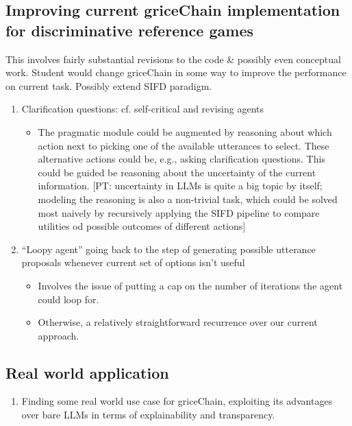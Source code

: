 \documentclass[fleqn,reqno,10pt]{article}
\newcommand{\pt}[1]{\textcolor{CSP-accent-1}{[PT: #1]}}
\begin{document}
\subsection{Improving current griceChain implementation for discriminative reference games}

This involves fairly substantial revisions to the code \& possibly even conceptual work.  Student would change griceChain in some way to improve the performance on current task. Possibly extend SIFD paradigm.

\begin{enumerate}
  \item Clarification questions: cf. self-critical and revising agents
  \begin{itemize}
    \item The pragmatic module could be augmented by reasoning about which action next to picking one of the available utterances to select. These alternative actions could be, e.g., asking clarification questions. This could be guided be reasoning about the uncertainty of the current information. \pt{uncertainty in LLMs is quite a big topic by itself; modeling the reasoning is also a non-trivial task, which could be solved most naively by recursively applying the SIFD pipeline to compare utilities od possible outcomes of different actions}
  \end{itemize}
  \item ``Loopy agent'' going back to the step of generating possible utterance proposals whenever current set of options isn't useful
  \begin{itemize}
    \item Involves the issue of putting a cap on the number of iterations the agent could loop for.
    \item Otherwise, a relatively straightforward recurrence over our current approach.
  \end{itemize}
\end{enumerate}

\subsection{Real world application}

\begin{enumerate}
  \item Finding some real world use case for griceChain, exploiting its advantages over bare LLMs in terms of explainability and transparency.
\end{enumerate}
\end{document}
